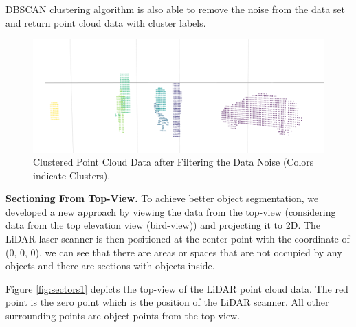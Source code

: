 DBSCAN clustering algorithm is also able to remove the noise from the data set and return point cloud data with cluster labels.


\begin{figure}[!h]
\begin{center}
  \includegraphics[width=.55\linewidth]{./images/seg_noise_removal.png}
  \caption{Clustered Point Cloud Data after Filtering the Data Noise (Colors indicate Clusters). }
  \label{fig:ClusteringWithNoiseFiltering}
\end{center}
\end{figure}



\textbf{Sectioning From Top-View.}
To achieve better object segmentation, we developed a new approach by viewing the data from the top-view (considering data from the top elevation 
view (bird-view)) and projecting it to 2D. The LiDAR laser scanner is then positioned at the center point with the coordinate of (0, 0, 0),
we can see that there are areas or spaces that are not occupied by any objects and there are sections with objects inside.

Figure \ref{fig:sectors1} depicts the top-view of the LiDAR point cloud data.
The red point is the zero point which is the position of the LiDAR scanner. All other surrounding points are object points from the top-view.

